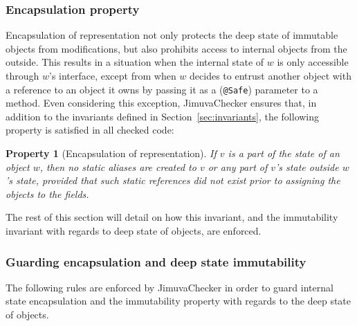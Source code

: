 \documentclass{pracamgr}
\theoremstyle{break}
\theoremstyle{break}
\newtheorem{invariant}{Property}
\theoremstyle{break}
\begin{document}
\subsubsection{Encapsulation property} 

Encapsulation of representation not only protects the deep state of
immutable objects from modifications, but also prohibits access to
internal objects from the outside. This results in a situation when
the internal state of $w$ is only accessible through $w$'s interface,
except from when $w$ decides to entrust another object with a
reference to an object it owns by passing it as a (\texttt{@Safe})
parameter to a method. Even considering this exception, JimuvaChecker
ensures that, in addition to the invariants defined in
Section~\ref{sec:invariants}, the following property is satisfied in
all checked code:

\begin{invariant}[Encapsulation of representation] \label{inv:encap}
  If $v$ is a part of the state of an object $w$, then no static
  aliases are created to $v$ or any part of $v$'s state outside $w$'s
  state, provided that such static references did not exist prior to
  assigning the objects to the fields.
\end{invariant}

The rest of this section will detail on how this invariant, and the
immutability invariant with regards to deep state of objects, are
enforced. 

\subsubsection{Guarding encapsulation and deep state immutability} 

The following rules are enforced by JimuvaChecker in order to guard
internal state encapsulation and the immutability property with
regards to the deep state of objects.
\end{document}
